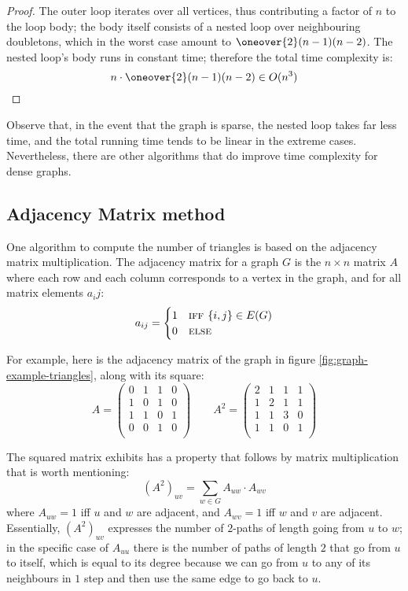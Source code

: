 \begin{proof}
    The outer loop iterates over all vertices, thus contributing a factor of $n$ to the loop body; the body itself consists of a nested loop over neighbouring doubletons, which in the worst case amount to $\oneover{2}(n - 1)(n - 2)$. The nested loop's body runs in constant time; therefore the total time complexity is:
    \[
        n \cdot \oneover{2}(n - 1)(n - 2) \in O(n^3)
    \]
\end{proof}

Observe that, in the event that the graph is sparse, the nested loop takes far less time, and the total running time tends to be linear in the extreme cases. Nevertheless, there are other algorithms that do improve time complexity for dense graphs.


\subsection{Adjacency Matrix method}

One algorithm to compute the number of triangles is based on the adjacency matrix multiplication. The adjacency matrix for a graph $G$ is the $n \times n$ matrix $A$ where each row and each column corresponds to a vertex in the graph, and for all matrix elements $a_ij$:
\[
    a_{ij} = \begin{cases}
        1 & \textsc{iff } \{i, j\} \in E(G) \\
        0 & \textsc{else}
    \end{cases}
\]

For example, here is the adjacency matrix of the graph in figure \ref{fig:graph-example-triangles}, along with its square:
\[
	A = \begin{pmatrix}
		0 & 1 & 1 & 0 \\
		1 & 0 & 1 & 0 \\
		1 & 1 & 0 & 1 \\
		0 & 0 & 1 & 0 \\
    \end{pmatrix}
    \qquad
	A^2 = \begin{pmatrix}
		2 & 1 & 1 & 1 \\
		1 & 2 & 1 & 1 \\
		1 & 1 & 3 & 0 \\
		1 & 1 & 0 & 1 \\
	\end{pmatrix}
\]

The squared matrix exhibits has a property that follows by matrix multiplication that is worth mentioning:
\[
	(A^2)_{uv} = \sum_{w \in G}A_{uw} \cdot A_{wv}
\]
where $A_{uw} = 1$ iff $u$ and $w$ are adjacent, and $A_{wv} = 1$ iff $w$ and $v$ are adjacent. Essentially, $(A^2)_{uv}$ expresses the number of $2$-paths of length going from $u$ to $w$; in the specific case of $A_{uu}$ there is the number of paths of length $2$ that go from $u$ to itself, which is equal to its degree because we can go from $u$ to any of its neighbours in $1$ step and then use the same edge to go back to $u$.

